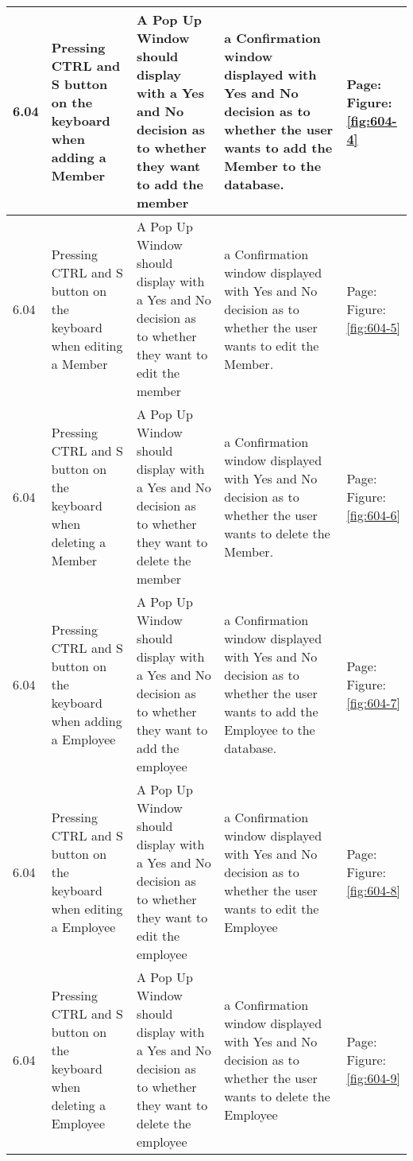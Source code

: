 \begin{flushleft}
\begin{longtable}{|p{1.0cm}|p{2.5cm}|p{3cm}|p{3.0cm}|p{2.5cm}|}
	6.04 & Pressing CTRL and S button on the keyboard when adding a Member &A Pop Up Window should display with a Yes and No decision as to whether they want to add the member & a Confirmation window displayed with Yes and No decision as to whether the user wants to add the Member to the database.&   Page:\pageref{fig:604-4}  \newline Figure:\ref{fig:604-4}\\ \hline
	6.04 & Pressing CTRL and S button on the keyboard when editing a Member &A Pop Up Window should display with a Yes and No decision as to whether they want to edit the member & a Confirmation window displayed with Yes and No decision as to whether the user wants to edit the Member.&   Page:\pageref{fig:604-5}  \newline Figure:\ref{fig:604-5}\\ \hline
	6.04 & Pressing CTRL and S button on the keyboard when deleting a Member &A Pop Up Window should display with a Yes and No decision as to whether they want to delete the member & a Confirmation window displayed with Yes and No decision as to whether the user wants to delete the Member.&  
	Page:\pageref{fig:604-6}  \newline Figure:\ref{fig:604-6} \\ \hline
	6.04 & Pressing CTRL and S button on the keyboard when adding a Employee &A Pop Up Window should display with a Yes and No decision as to whether they want to add the employee & a Confirmation window displayed with Yes and No decision as to whether the user wants to add the Employee to the database.&   Page:\pageref{fig:604-7}  \newline Figure:\ref{fig:604-7}\\ \hline
	6.04 & Pressing CTRL and S button on the keyboard when editing a Employee &A Pop Up Window should display with a Yes and No decision as to whether they want to edit the employee & a Confirmation window displayed with Yes and No decision as to whether the user wants to edit the Employee&         Page:\pageref{fig:604-8}  \newline Figure:\ref{fig:604-8}\\ \hline
	6.04 & Pressing CTRL and S button on the keyboard when deleting a Employee &A Pop Up Window should display with a Yes and No decision as to whether they want to delete the employee & a Confirmation window displayed with Yes and No decision as to whether the user wants to delete the Employee&     Page:\pageref{fig:604-9}  \newline Figure:\ref{fig:604-9}\\ \hline

\end{longtable}
\end{flushleft}
